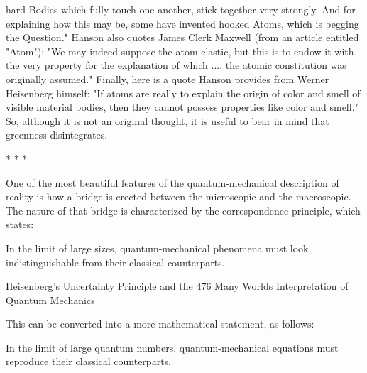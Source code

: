 hard Bodies which fully touch one another, stick together very strongly. And for
explaining how this may be, some have invented hooked Atoms, which is begging the
Question." Hanson also quotes James Clerk Maxwell (from an article entitled
"Atom"): "We may indeed suppose the atom elastic, but this is to endow it with the
very property for the explanation of which .... the atomic constitution was originally
assumed." Finally, here is a quote Hanson provides from Werner Heisenberg himself:
"If atoms are really to explain the origin of color and smell of visible material bodies,
then they cannot possess properties like color and smell." So, although it is not an
original thought, it is useful to bear in mind that greenness disintegrates.

                                       *   *   *

        One of the most beautiful features of the quantum-mechanical description of
reality is how a bridge is erected between the microscopic and the macroscopic. The
nature of that bridge is characterized by the correspondence principle, which states:

   In the limit of large sizes, quantum-mechanical phenomena must look
   indistinguishable from their classical counterparts.




Heisenberg's Uncertainty Principle and the                                           476
Many Worlds Interpretation of Quantum Mechanics

This can be converted into a more mathematical statement, as follows:

   In the limit of large quantum numbers, quantum-mechanical equations must
   reproduce their classical counterparts.

